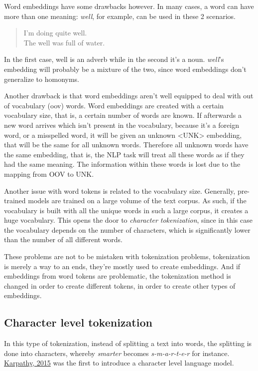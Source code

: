 Word embeddings have some drawbacks however. In many cases, a word can have more than one meaning: \emph{well}, for example, can be used in these 2 scenarios.

\begin{quote}
    I'm doing quite well.\\
    The well was full of water.
\end{quote}

In the first case, well is an adverb while in the second it's a noun. \emph{well}'s embedding will probably be a mixture of the two, since word embeddings don't generalize to homonyms.

Another drawback is that word embeddings aren't well equipped to deal with out of vocabulary (oov) words. Word embeddings are created with a certain vocabulary size, that is, a certain number of words are known. If afterwards a new word arrives which isn't present in the vocabulary, because it's a foreign word, or a misspelled word, it will be given an unknown <UNK> embedding, that will be the same for all unknown words. Therefore all unknown words have the same embedding, that is, the NLP task will treat all these words as if they had the same meaning. The information within these words is lost due to the mapping from OOV to UNK.

Another issue with word tokens is related to the vocabulary size. Generally, pre-trained models are trained on a large volume of the text corpus. As such, if the vocabulary is built with all the unique words in such a large corpus, it creates a huge vocabulary. This opens the door to \emph{character tokenization}, since in this case the vocabulary depends on the number of characters, which is significantly lower than the number of all different words.

These problems are not to be mistaken with tokenization problems, tokenization is merely a way to an ends, they're mostly used to create embeddings. And if embeddings from word tokens are problematic, the tokenization method is changed in order to create different tokens, in order to create other types of embeddings.
    
\subsection{Character level tokenization}

In this type of tokenization, instead of splitting a text into words, the splitting is done into characters, whereby \emph{smarter} becomes \emph{s-m-a-r-t-e-r} for instance. \href{https://github.com/karpathy/char-rnn}{Karpathy, 2015} was the first to introduce a character level language model.

